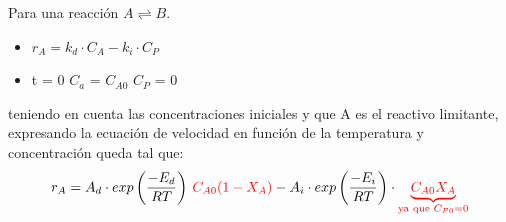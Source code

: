 Para una reacción $A\rightleftharpoons B$.

\begin{itemize}
    \item $r_A = k_d \cdot C_A - k_i \cdot C_P$
    \item t = 0 \hspace{4em } $C_a$ = $C_{A0}$ \hspace{4em } $C_P$ = 0
\end{itemize}
teniendo en cuenta las concentraciones iniciales y que A es el reactivo limitante, expresando la ecuación de velocidad en función de la temperatura y concentración queda tal que:
\begin{equation}
    r_A = A_d \cdot exp\left({\frac{-E_d}{RT}}\right) \hspace{0.2em}\textcolor{red}{C_{A0}(1-X_A)}- A_i \cdot exp\left({\frac{-E_i}{RT}}\right)\cdot \textcolor{red}{\underbrace{C_{A0}X_A}_{\text{ya que }C_{P0} =0 }}
    \label{Ec:2.24}
\end{equation}

